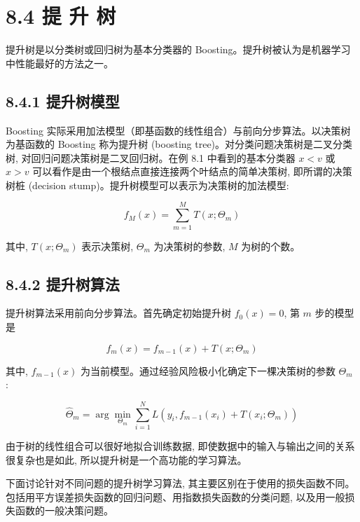 \documentclass[10pt]{article}
\begin{document}
\section*{8.4 提 升 树}
提升树是以分类树或回归树为基本分类器的 Boosting。提升树被认为是机器学习中性能最好的方法之一。

\subsection*{8.4.1 提升树模型}
Boosting 实际采用加法模型（即基函数的线性组合）与前向分步算法。以决策树为基函数的 Boosting 称为提升树 (boosting tree)。对分类问题决策树是二叉分类树, 对回归问题决策树是二叉回归树。在例 8.1 中看到的基本分类器 $x<v$ 或 $x>v$ 可以看作是由一个根结点直接连接两个叶结点的简单决策树, 即所谓的决策树桩 (decision stump)。提升树模型可以表示为决策树的加法模型:


\begin{equation*}
f_{M}(x)=\sum_{m=1}^{M} T\left(x ; \Theta_{m}\right) \tag{8.24}
\end{equation*}


其中, $T\left(x ; \Theta_{m}\right)$ 表示决策树, $\Theta_{m}$ 为决策树的参数, $M$ 为树的个数。

\subsection*{8.4.2 提升树算法}
提升树算法采用前向分步算法。首先确定初始提升树 $f_{0}(x)=0$, 第 $m$ 步的模型是


\begin{equation*}
f_{m}(x)=f_{m-1}(x)+T\left(x ; \Theta_{m}\right) \tag{https://cdn.mathpix.com/cropped/2024_03_13_85ccebcbbc039fa5a6c0g-03.jpg?height=172&width=302&top_left_y=7814&top_left_x=5219}
\end{equation*}


其中, $f_{m-1}(x)$ 为当前模型。通过经验风险极小化确定下一棵决策树的参数 $\Theta_{m}$ :


\begin{equation*}
\hat{\Theta}_{m}=\arg \min _{\Theta_{m}} \sum_{i=1}^{N} L\left(y_{i}, f_{m-1}\left(x_{i}\right)+T\left(x_{i} ; \Theta_{m}\right)\right) \tag{8.26}
\end{equation*}


由于树的线性组合可以很好地拟合训练数据, 即使数据中的输入与输出之间的关系很复杂也是如此, 所以提升树是一个高功能的学习算法。

下面讨论针对不同问题的提升树学习算法, 其主要区别在于使用的损失函数不同。包括用平方误差损失函数的回归问题、用指数损失函数的分类问题, 以及用一般损失函数的一般决策问题。
\end{document}
